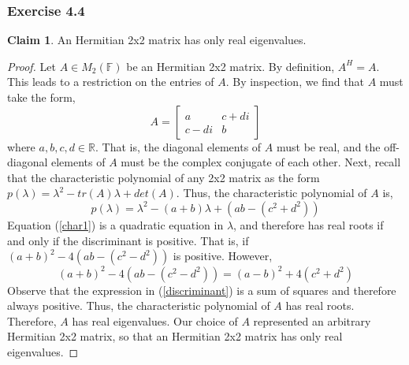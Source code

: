 \documentclass[letterpaper,12pt]{article}
\theoremstyle{definition}
\newtheorem{claim}[theorem]{Claim}
\begin{document}
\subsubsection*{Exercise 4.4}
\begin{claim}
	An Hermitian 2x2 matrix has only real eigenvalues.
\end{claim}
\begin{proof}
	Let $A \in M_2(\mathbb{F})$ be an Hermitian 2x2 matrix. By definition, $A^H = A$. This leads to a restriction on the entries of $A$. By inspection, we find that $A$ must take the form,
	\begin{equation}
	A =
	\begin{bmatrix}
	a & c + di \\
	c - di & b
	\end{bmatrix}
	\end{equation}
	where $a, b, c, d \in \mathbb{R}$.	That is, the diagonal elements of $A$ must be real, and the off-diagonal elements of $A$ must be the complex conjugate of each other. Next, recall that the characteristic polynomial of any 2x2 matrix as the form $p(\lambda) = \lambda^2 - tr(A)\lambda + det(A)$.  Thus, the characteristic polynomial of $A$ is,
	\begin{equation}\label{char1}
	p(\lambda) = \lambda^2 - (a + b)\lambda + (ab - (c^2 + d^2))
	\end{equation}
	Equation (\ref{char1}) is a quadratic equation in $\lambda$, and therefore has real roots if and only if the discriminant is positive. That is, if $(a+b)^2 - 4(ab - (c^2 - d^2))$ is positive. However, 
	\begin{equation}\label{discriminant}
	(a+b)^2 - 4(ab - (c^2 - d^2)) = (a-b)^2 + 4(c^2 + d^2)
	\end{equation}
	Observe that the expression in (\ref{discriminant}) is a sum of squares and therefore always positive. Thus, the characteristic polynomial of $A$ has real roots. Therefore, $A$ has real eigenvalues. Our choice of $A$ represented an arbitrary  Hermitian 2x2 matrix, so that an Hermitian 2x2 matrix has only real eigenvalues.
\end{proof}
\end{document}
